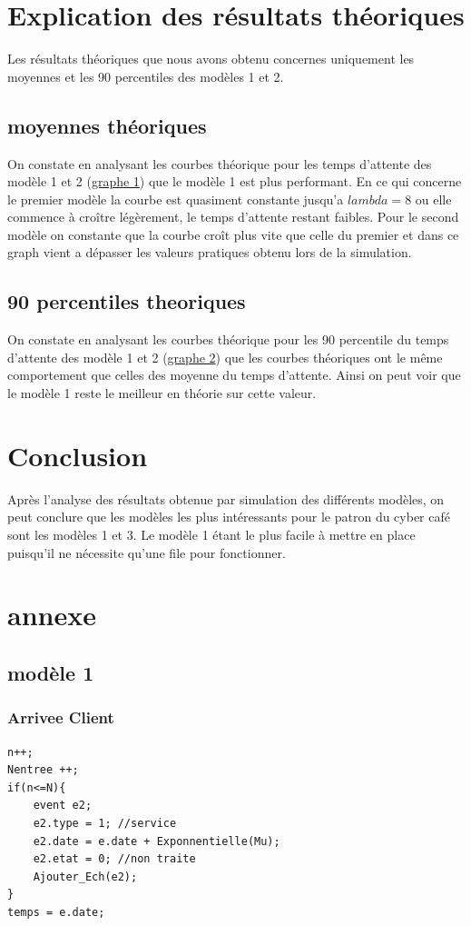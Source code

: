 \documentclass[a4paper,11pt]{article}
\begin{document}
\section{Explication des résultats théoriques}
	Les résultats théoriques que nous avons obtenu concernes uniquement les moyennes et les 90 percentiles des modèles 1 et 2.
	\subsection{moyennes théoriques}
	On constate en analysant les courbes théorique pour les temps d'attente des modèle 1 et 2 (\hyperref[fig1]{graphe 1}) que le modèle 1 est plus performant. En ce qui concerne le premier modèle la courbe est quasiment constante jusqu'a $lambda = 8$ ou elle commence à croître légèrement, le temps d'attente restant faibles.
	Pour le second modèle on constante que la courbe croît plus vite que celle du premier et dans ce graph vient a dépasser les valeurs pratiques obtenu lors de la simulation.
	\subsection{90 percentiles theoriques}
	On constate en analysant les courbes théorique pour les 90 percentile du temps d'attente des modèle 1 et 2 (\hyperref[fig2]{graphe 2}) que les courbes théoriques ont le même comportement que celles des moyenne du temps d'attente.
	Ainsi on peut voir que le modèle 1 reste le meilleur en théorie sur cette valeur.
	
\section{Conclusion}
	Après l'analyse des résultats obtenue par simulation des différents modèles, on peut conclure que les modèles les plus intéressants pour le patron du cyber café sont les modèles 1 et 3. Le modèle 1 étant le plus facile à mettre en place puisqu'il ne nécessite qu'une file pour fonctionner.
	
\section{annexe}
\label{annexe}
	\subsection{modèle 1}
		\subsubsection{Arrivee Client}
	\begin{lstlisting}
n++; 
Nentree ++; 
if(n<=N){
	event e2;
	e2.type = 1; //service
	e2.date = e.date + Exponnentielle(Mu);
	e2.etat = 0; //non traite
	Ajouter_Ech(e2);
}
temps = e.date;
	\end{lstlisting}
\end{document}
